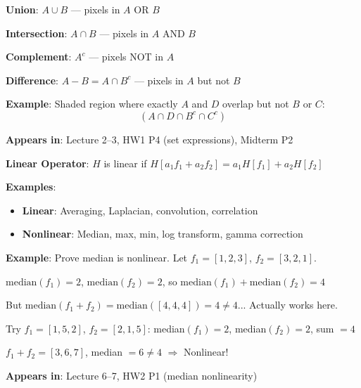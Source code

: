 \documentclass[10pt]{article}
\begin{document}

\begin{conceptbox}

\begin{formulabox}
\textbf{Union}: $A \cup B$ --- pixels in $A$ OR $B$

\textbf{Intersection}: $A \cap B$ --- pixels in $A$ AND $B$

\textbf{Complement}: $A^c$ --- pixels NOT in $A$

\textbf{Difference}: $A - B = A \cap B^c$ --- pixels in $A$ but not $B$
\end{formulabox}

\begin{examplebox}
\textbf{Example}: Shaded region where exactly $A$ and $D$ overlap but not $B$ or $C$:
\[
(A \cap D \cap B^c \cap C^c)
\]
\end{examplebox}

\textbf{Appears in}: Lecture 2--3, HW1 P4 (set expressions), Midterm P2

\end{conceptbox}


\begin{conceptbox}

\begin{formulabox}
\textbf{Linear Operator}: $H$ is linear if $H[a_1 f_1 + a_2 f_2] = a_1 H[f_1] + a_2 H[f_2]$

\textbf{Examples}:
\begin{itemize}[leftmargin=1.5em, itemsep=0pt, topsep=2pt]
    \item \textbf{Linear}: Averaging, Laplacian, convolution, correlation
    \item \textbf{Nonlinear}: Median, max, min, log transform, gamma correction
\end{itemize}
\end{formulabox}

\begin{examplebox}
\textbf{Example}: Prove median is nonlinear. Let $f_1 = [1,2,3]$, $f_2 = [3,2,1]$.

$\text{median}(f_1) = 2$, $\text{median}(f_2) = 2$, so $\text{median}(f_1) + \text{median}(f_2) = 4$

But $\text{median}(f_1 + f_2) = \text{median}([4,4,4]) = 4 \ne 4$... Actually works here.

Try $f_1 = [1,5,2]$, $f_2 = [2,1,5]$: median$(f_1)=2$, median$(f_2)=2$, sum $=4$

$f_1 + f_2 = [3,6,7]$, median $= 6 \ne 4$ \quad $\Rightarrow$ Nonlinear!
\end{examplebox}

\textbf{Appears in}: Lecture 6--7, HW2 P1 (median nonlinearity)

\end{conceptbox}
\end{document}
